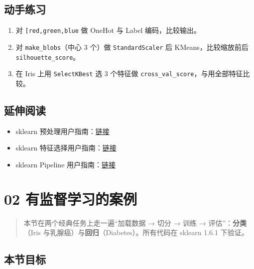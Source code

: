 \subsection{动手练习}\label{ux52a8ux624bux7ec3ux4e60-5}

\begin{enumerate}
\def\labelenumi{\arabic{enumi}.}
\tightlist
\item
  对
  \texttt{{[}\textquotesingle{}red\textquotesingle{},\textquotesingle{}green\textquotesingle{},\textquotesingle{}blue\textquotesingle{}{]}}
  做 OneHot 与 Label 编码，比较输出。
\item
  对 \texttt{make\_blobs}（中心 3 个）做 \texttt{StandardScaler} 后
  KMeans，比较缩放前后 \texttt{silhouette\_score}。
\item
  在 Iris 上用 \texttt{SelectKBest} 选 3 个特征做
  \texttt{cross\_val\_score}，与用全部特征比较。
\end{enumerate}

\subsection{延伸阅读}\label{ux5ef6ux4f38ux9605ux8bfb-34}

\begin{itemize}
\tightlist
\item
  sklearn
  预处理用户指南：\href{https://scikit-learn.org/stable/modules/preprocessing.html}{链接}
\item
  sklearn
  特征选择用户指南：\href{https://scikit-learn.org/stable/modules/feature_selection.html}{链接}
\item
  sklearn Pipeline
  用户指南：\href{https://scikit-learn.org/stable/modules/compose.html\#pipeline}{链接}
\end{itemize}

\section{02
有监督学习的案例}\label{ux6709ux76d1ux7763ux5b66ux4e60ux7684ux6848ux4f8b}

\begin{quote}
本节在两个经典任务上走一遍``加载数据 → 切分 → 训练 →
评估''：\textbf{分类}（Iris
与乳腺癌）与\textbf{回归}（Diabetes）。所有代码在 sklearn 1.6.1 下验证。
\end{quote}

\subsection{本节目标}\label{ux672cux8282ux76eeux6807-29}

